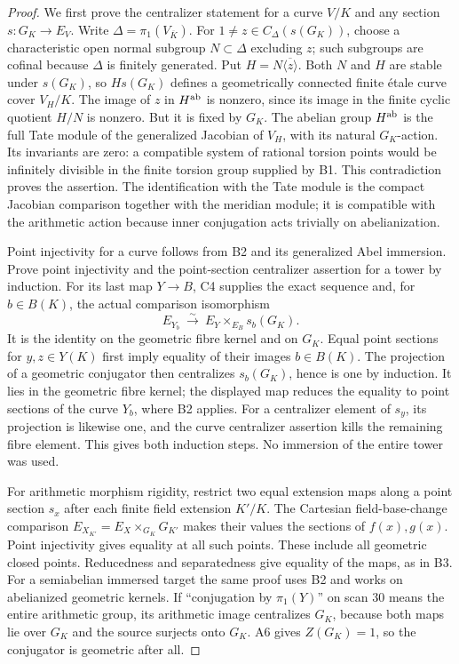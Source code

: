 \begin{proof}
We first prove the centralizer statement for a curve $V/K$ and any
section $s:G_K\to E_V$. Write $\Delta=\pi_1(V_{\overline K})$.
For $1\ne z\in C_\Delta(s(G_K))$, choose a characteristic open
normal subgroup $N\subset\Delta$ excluding $z$; such subgroups are
cofinal because $\Delta$ is finitely generated. Put
$H=N\overline{\langle z\rangle}$. Both $N$ and $H$ are stable under
$s(G_K)$, so $Hs(G_K)$ defines a geometrically connected finite
\'etale curve cover $V_H/K$. The image of $z$ in $H^{\rm ab}$ is
nonzero, since its image in the finite cyclic quotient $H/N$ is
nonzero. But it is fixed by $G_K$. The abelian group $H^{\rm ab}$
is the full Tate module of the generalized Jacobian of $V_H$,
with its natural $G_K$-action. Its invariants are zero: a compatible
system of rational torsion points would be infinitely divisible
in the finite torsion group supplied by B1. This contradiction
proves the assertion. The identification with the Tate module is
the compact Jacobian comparison together with the meridian module;
it is compatible with the arithmetic action because inner
conjugation acts trivially on abelianization.

Point injectivity for a curve follows from B2 and its generalized
Abel immersion. Prove point injectivity and the point-section
centralizer assertion for a tower by induction. For its last map
$Y\to B$, C4 supplies the exact sequence and, for $b\in B(K)$,
the actual comparison isomorphism
\[
 E_{Y_b}\ \xrightarrow{\sim}\ E_Y\times_{E_B}s_b(G_K).
\]
It is the identity on the geometric fibre kernel and on $G_K$.
Equal point sections for $y,z\in Y(K)$ first imply equality of their
images $b\in B(K)$. The projection of a geometric conjugator then
centralizes $s_b(G_K)$, hence is one by induction. It lies in the
geometric fibre kernel; the displayed map reduces the equality to
point sections of the curve $Y_b$, where B2 applies. For a centralizer
element of $s_y$, its projection is likewise one, and the curve
centralizer assertion kills the remaining fibre element. This gives
both induction steps. No immersion of the entire tower was used.

For arithmetic morphism rigidity, restrict two equal extension maps
along a point section $s_x$ after each finite field extension $K'/K$.
The Cartesian field-base-change comparison
$E_{X_{K'}}=E_X\times_{G_K}G_{K'}$ makes their values the sections
of $f(x),g(x)$. Point injectivity gives equality at all such points.
These include all geometric closed points. Reducedness and
separatedness give equality of the maps, as in B3. For a semiabelian
immersed target the same proof uses B2 and works on abelianized
geometric kernels. If ``conjugation by $\pi_1(Y)$'' on scan 30 means
the entire arithmetic group, its arithmetic image centralizes $G_K$,
because both maps lie over $G_K$ and the source surjects onto $G_K$.
A6 gives $Z(G_K)=1$, so the conjugator is geometric after all.


\end{proof}
